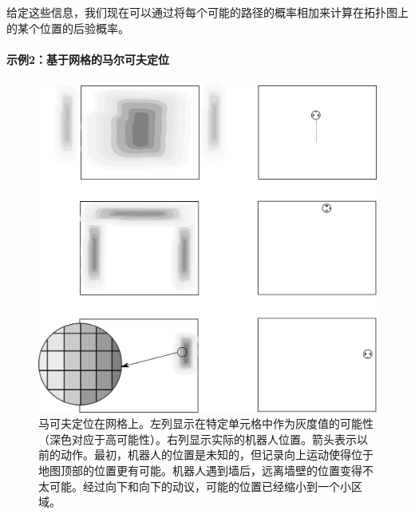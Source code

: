 给定这些信息，我们现在可以通过将每个可能的路径的概率相加来计算在拓扑图上的某个位置的后验概率。

\paragraph{示例2：基于网格的马尔可夫定位}

\begin{figure}
	\centering
		\includegraphics[width=\textwidth]{figs/markov_grid_example}
	\caption{马可夫定位在网格上。左列显示在特定单元格中作为灰度值的可能性（深色对应于高可能性）。右列显示实际的机器人位置。箭头表示以前的动作。最初，机器人的位置是未知的，但记录向上运动使得位于地图顶部的位置更有可能。机器人遇到墙后，远离墙壁的位置变得不太可能。经过向下和向下的动议，可能的位置已经缩小到一个小区域。}
	\label{fig:markov_grid_example}
\end{figure}

